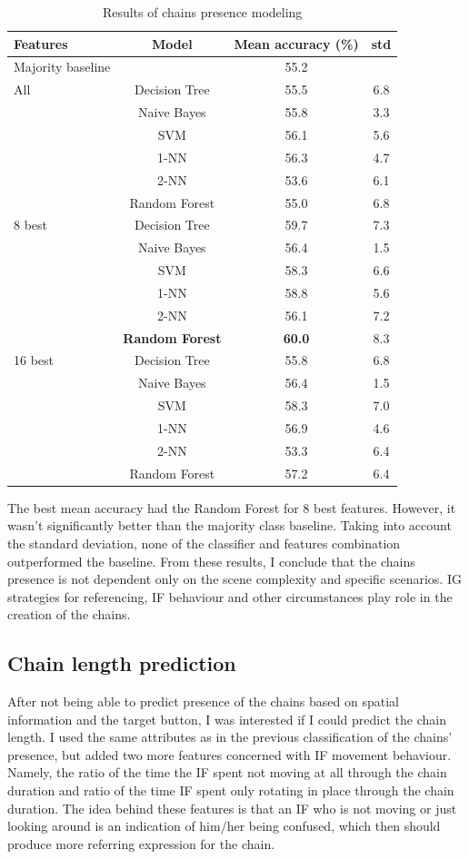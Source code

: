 \begin{table}[!htbp]
 \centering
\begin{tabular}{lccc}
\toprule
Features & Model    & Mean accuracy (\%) & std \\
\midrule
Majority baseline &    & 55.2	& \\
\midrule
All & Decision Tree 	& 55.5		& 6.8 	\\
	& Naive Bayes  	& 55.8		& 3.3 	\\
	& SVM 			& 56.1		& 5.6  	\\
	& 1-NN			& 56.3		& 4.7 	\\
	& 2-NN			& 53.6		& 6.1 	\\
	& Random Forest	& 55.0		& 6.8	\\
\midrule
8 best 	& Decision Tree 	& 	59.7		& 7.3  	\\
		& Naive Bayes  	&	56.4		& 1.5 	\\
		& SVM 			&	58.3		& 6.6 	\\
		& 1-NN			&	58.8		& 5.6 	\\
		& 2-NN			&	56.1		& 7.2 	\\
		& \textbf{Random Forest}	&	\textbf{60.0	}	& 8.3 	\\
\midrule
16 best & Decision Tree 	& 55.8	& 6.8  	\\
	& Naive Bayes  		& 56.4	& 1.5 	\\
	& SVM 				& 58.3	& 7.0  	\\
	& 1-NN				& 56.9	& 4.6  	\\
	& 2-NN				& 53.3	& 6.4  	\\
	& Random Forest		& 57.2	& 6.4  	\\	
\bottomrule
\end{tabular}
\caption{Results of chains presence modeling}
\label{tab:chains-ml-presence}
\end{table}

The best mean accuracy had the Random Forest for 8 best features. However, it wasn't significantly better than the majority class baseline. Taking into account the standard deviation, none of the classifier and features combination outperformed the baseline.  From these results, I conclude that the chains presence is not dependent only on the scene complexity and specific scenarios. IG strategies for referencing, IF behaviour and other circumstances play role in the creation of the chains.

\subsection{Chain length prediction}
After not being able to predict presence of the chains based on spatial information and the target button, I was interested if I could predict the chain length. I used the same attributes as in the previous classification of the chains' presence, but added two more features concerned with IF movement behaviour. Namely, the ratio of the time the IF spent not moving at all through the chain duration and ratio of the time IF spent only rotating in place through the chain duration. The idea behind these features is that an IF who is not moving or just looking around is an indication of him/her being confused, which then should produce more referring expression for the chain.

